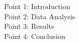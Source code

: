 \documentclass[preview]{standalone}
\begin{document}
Point 1: Introduction\\Point 2: Data Analysis\\Point 3: Results\\Point 4: Conclusion\\
\end{document}
